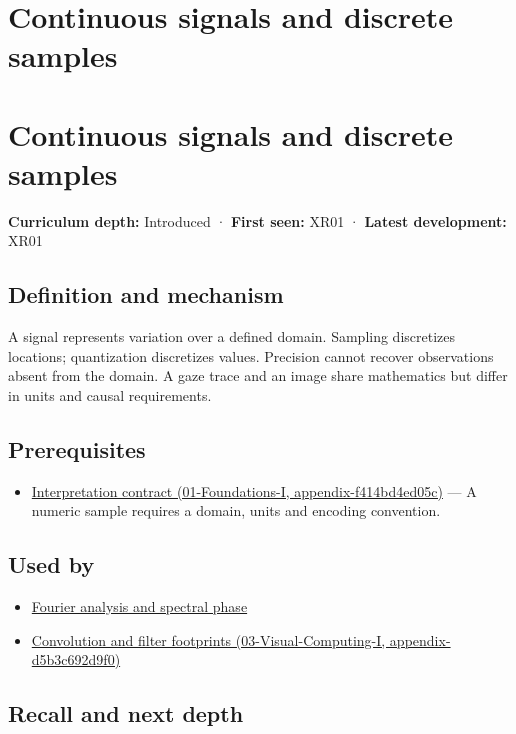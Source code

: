 \hypertarget{appendix-1077ea8fc737}{}
\section*{Continuous signals and discrete samples}
\section{Continuous signals and discrete samples}\label{continuous-signals-and-discrete-samples}

\textbf{Curriculum depth:} Introduced · \textbf{First seen:} XR01 · \textbf{Latest development:} XR01

\subsection{Definition and mechanism}\label{definition-and-mechanism}

A signal represents variation over a defined domain. Sampling discretizes locations; quantization discretizes values. Precision cannot recover observations absent from the domain. A gaze trace and an image share mathematics but differ in units and causal requirements.

\subsection{Prerequisites}\label{prerequisites}

\begin{itemize}
\tightlist
\item
  \href{}{Interpretation contract (01-Foundations-I, appendix-f414bd4ed05c)} --- A numeric sample requires a domain, units and encoding convention.
\end{itemize}

\subsection{Used by}\label{used-by}

\begin{itemize}
\tightlist
\item
  \hyperref[appendix-b60686ba06a1]{Fourier analysis and spectral phase}
\item
  \href{}{Convolution and filter footprints (03-Visual-Computing-I, appendix-d5b3c692d9f0)}
\end{itemize}

\subsection{Recall and next depth}\label{recall-and-next-depth}

